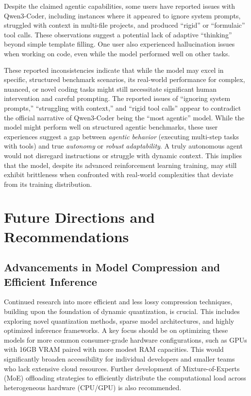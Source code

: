 Despite the claimed agentic capabilities, some users have reported issues with Qwen3-Coder, including instances where it appeared to ignore system prompts, struggled with context in multi-file projects, and produced ``rigid'' or ``formulaic'' tool calls.\cite{reddit_localllama_kimi_qwen3coder_2025} These observations suggest a potential lack of adaptive ``thinking'' beyond simple template filling. One user also experienced hallucination issues when working on code, even while the model performed well on other tasks.\cite{reddit_localllama_qwen3coder_1_2025}

These reported inconsistencies indicate that while the model may excel in specific, structured benchmark scenarios, its real-world performance for complex, nuanced, or novel coding tasks might still necessitate significant human intervention and careful prompting. The reported issues of ``ignoring system prompts,'' ``struggling with context,'' and ``rigid tool calls'' appear to contradict the official narrative of Qwen3-Coder being the ``most agentic'' model.\cite{reddit_localllama_kimi_qwen3coder_2025} While the model might perform well on structured agentic benchmarks, these user experiences suggest a gap between \textit{agentic behavior} (executing multi-step tasks with tools) and true \textit{autonomy} or \textit{robust adaptability}. A truly autonomous agent would not disregard instructions or struggle with dynamic context. This implies that the model, despite its advanced reinforcement learning training, may still exhibit brittleness when confronted with real-world complexities that deviate from its training distribution.

\section{Future Directions and Recommendations}

\subsection{Advancements in Model Compression and Efficient Inference}

Continued research into more efficient and less lossy compression techniques, building upon the foundation of dynamic quantization, is crucial. This includes exploring novel quantization methods, sparse model architectures, and highly optimized inference frameworks.\cite{hackernews_qwen3coder_2025, unsloth_qwen3coder_local_2025} A key focus should be on optimizing these models for more common consumer-grade hardware configurations, such as GPUs with 16GB VRAM paired with more modest RAM capacities. This would significantly broaden accessibility for individual developers and smaller teams who lack extensive cloud resources.\cite{hackernews_qwen3coder_2025, unsloth_qwen3coder_local_2025, reddit_localllama_kimi_qwen3coder_2025} Further development of Mixture-of-Experts (MoE) offloading strategies to efficiently distribute the computational load across heterogeneous hardware (CPU/GPU) is also recommended.\cite{unsloth_qwen3coder_local_2025}

